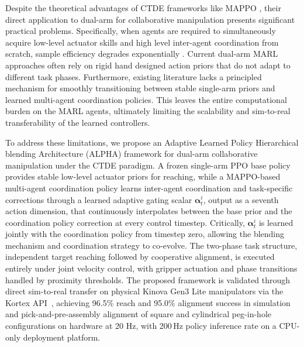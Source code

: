 \documentclass[lettersize,journal]{IEEEtran}
\begin{document}
Despite the theoretical advantages of CTDE frameworks like MAPPO \cite{MAPPO}, their direct application to dual-arm for collaborative manipulation presents significant practical problems. Specifically, when agents are required to simultaneously acquire low-level actuator skills and high level inter-agent coordination from scratch, sample efficiency degrades exponentially \cite{intro-26, intro-27}. Current dual-arm MARL approaches often rely on rigid hand designed action priors that do not adapt to different task phases. Furthermore, existing literature lacks a principled mechanism for smoothly transitioning between stable single-arm priors and learned multi-agent coordination policies. This leaves the entire computational burden on the MARL agents, ultimately limiting the scalability and sim-to-real transferability of the learned controllers.

To address these limitations, we propose an Adaptive Learned Policy Hierarchical blending Architecture (ALPHA) framework for dual-arm collaborative manipulation under the CTDE paradigm. A frozen single-arm PPO base policy provides stable low-level actuator priors for reaching, while a MAPPO-based multi-agent coordination policy learns inter-agent coordination and task-specific corrections through a learned adaptive gating scalar $\mathbf{\alpha}^{i}_{t}$, output as a seventh action dimension, that continuously interpolates between the base prior and the coordination policy correction at every control timestep. Critically, $\mathbf{\alpha}^{i}_{t}$ is learned jointly with the coordination policy from timestep zero, allowing the blending mechanism and coordination strategy to co-evolve. The two-phase task structure, independent target reaching followed by cooperative alignment, is executed entirely under joint velocity control, with gripper actuation and phase transitions handled by proximity thresholds. The proposed framework is validated through direct sim-to-real transfer on physical Kinova Gen3 Lite manipulators via the Kortex API~\cite{Kinovarobotics_2025}, achieving 96.5\% reach and 95.0\% alignment success in simulation and pick-and-pre-assembly alignment of square and cylindrical peg-in-hole configurations on hardware at 20 Hz, with 200\,Hz policy inference rate on a CPU-only deployment platform.
\end{document}
